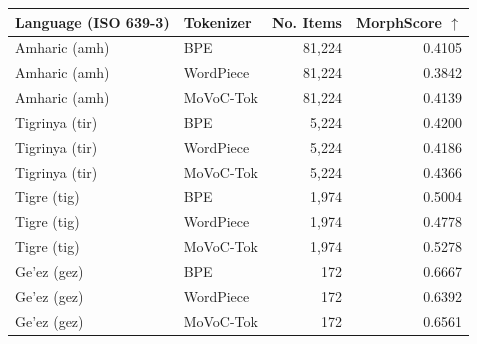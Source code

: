 \begin{tabular}{llrr}
\toprule
Language (ISO 639-3) & Tokenizer & No. Items & MorphScore $\uparrow$ \\
\midrule
Amharic (amh) & BPE & 81,224 & 0.4105 \\
Amharic (amh) & WordPiece & 81,224 & 0.3842 \\
Amharic (amh) & MoVoC-Tok & 81,224 & 0.4139 \\
Tigrinya (tir) & BPE & 5,224 & 0.4200 \\
Tigrinya (tir) & WordPiece & 5,224 & 0.4186 \\
Tigrinya (tir) & MoVoC-Tok & 5,224 & 0.4366 \\
Tigre (tig) & BPE & 1,974 & 0.5004 \\
Tigre (tig) & WordPiece & 1,974 & 0.4778 \\
Tigre (tig) & MoVoC-Tok & 1,974 & 0.5278 \\
Ge'ez (gez) & BPE & 172 & 0.6667 \\
Ge'ez (gez) & WordPiece & 172 & 0.6392 \\
Ge'ez (gez) & MoVoC-Tok & 172 & 0.6561 \\
\bottomrule
\end{tabular}
